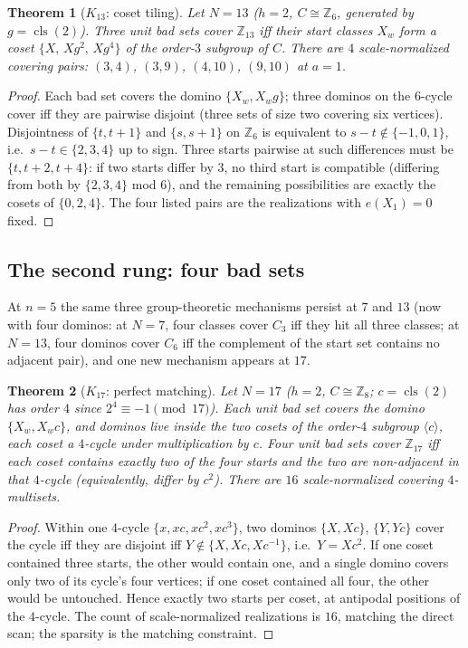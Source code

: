 \documentclass[11pt,a4paper]{article}
\numberwithin{equation}{section}
\theoremstyle{plain}
\newtheorem{theorem}{Theorem}[section]
\theoremstyle{definition}
\theoremstyle{remark}
\newcommand{\Z}{\mathbb{Z}}
\DeclareMathOperator{\cls}{cls}
\begin{document}
\begin{theorem}[$K_{13}$: coset tiling]\label{thm:K13}
Let $N=13$ ($h=2$, $C\cong\Z_6$, generated by $g=\cls(2)$). Three unit
bad sets cover $\Z_{13}$ iff their start classes $X_w$ form a coset
$\{X,\,Xg^2,\,Xg^4\}$ of the order-$3$ subgroup of $C$. There are $4$
scale-normalized covering pairs: $(3,4)$, $(3,9)$, $(4,10)$, $(9,10)$ at
$a=1$.
\end{theorem}

\begin{proof}
Each bad set covers the domino $\{X_w,X_wg\}$; three dominos on the
$6$-cycle cover iff they are pairwise disjoint (three sets of size two
covering six vertices). Disjointness of $\{t,t+1\}$ and $\{s,s+1\}$ on
$\Z_6$ is equivalent to $s-t\notin\{-1,0,1\}$, i.e.\ $s-t\in\{2,3,4\}$
up to sign. Three starts pairwise at such differences must be
$\{t,t+2,t+4\}$: if two starts differ by $3$, no third start is compatible
(differing from both by $\{2,3,4\}$ mod $6$), and the remaining
possibilities are exactly the cosets of $\{0,2,4\}$. The four listed
pairs are the realizations with $e(X_1)=0$ fixed.
\end{proof}

\subsection{The second rung: four bad sets}\label{sec:K5}

At $n=5$ the same three group-theoretic mechanisms persist at
$7$ and $13$ (now with four dominos: at $N=7$, four classes cover
$C_3$ iff they hit all three classes; at $N=13$, four dominos cover
$C_6$ iff the complement of the start set contains no adjacent pair), and
one new mechanism appears at $17$.

\begin{theorem}[$K_{17}$: perfect matching]\label{thm:K17}
Let $N=17$ ($h=2$, $C\cong\Z_8$; $c=\cls(2)$ has order $4$ since
$2^4\equiv-1 \pmod{17}$). Each unit bad set covers the domino
$\{X_w,X_wc\}$, and dominos live inside the two cosets of the order-$4$
subgroup $\langle c\rangle$, each coset a $4$-cycle under multiplication
by $c$. Four unit bad sets cover $\Z_{17}$ iff each coset contains
exactly two of the four starts and the two are non-adjacent in that
$4$-cycle (equivalently, differ by $c^2$). There are $16$
scale-normalized covering $4$-multisets.
\end{theorem}

\begin{proof}
Within one $4$-cycle $\{x,xc,xc^2,xc^3\}$, two dominos
$\{X,Xc\}$, $\{Y,Yc\}$ cover the cycle iff they are disjoint iff
$Y\notin\{X,Xc,Xc^{-1}\}$, i.e.\ $Y=Xc^2$. If one coset contained three
starts, the other would contain one, and a single domino covers only two
of its cycle's four vertices; if one coset contained all four, the other
would be untouched. Hence exactly two starts per coset, at antipodal
positions of the $4$-cycle. The count of scale-normalized realizations is
$16$, matching the direct scan; the sparsity is the matching constraint.
\end{proof}
\end{document}
